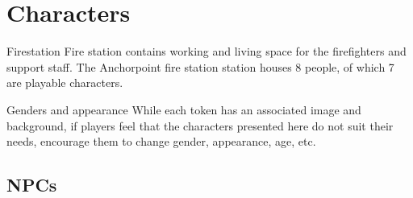 \chapter{Characters}


\begin{rpg-commentbox}{Firestation}
    Fire station contains working and living space for the firefighters and support staff. The Anchorpoint fire station station houses 8 people, of which 7 are playable characters.
\end{rpg-commentbox}

\begin{rpg-warnbox}{Genders and appearance}
    While each token has an associated image and background, if players feel that the characters presented here do not suit their needs, encourage them to change gender, appearance, age, etc. 
\end{rpg-warnbox}



\clearpage






\clearpage


\section{NPCs}


% 

